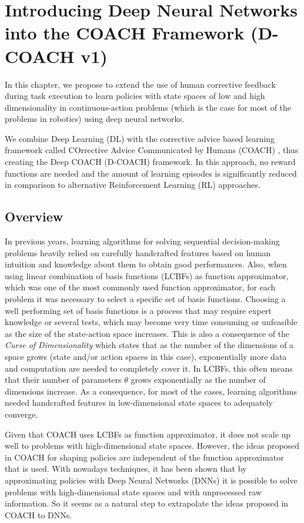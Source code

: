 \chapter{Introducing Deep Neural Networks into the COACH Framework (D-COACH v1)}
In this chapter, we propose to extend the use of human corrective feedback during task execution to learn policies with state spaces of low and high dimensionality in $\text{continuous-action}$ problems (which is the case for most of the problems in robotics) using deep neural networks.

 We combine Deep Learning (DL) with the corrective advice based learning framework called COrrective Advice Communicated by Humans (COACH) \cite{Celemin2018AnInteractive}, thus creating the Deep COACH (D-COACH) framework. In this approach, no reward functions are needed and the amount of learning episodes is significantly reduced in comparison to alternative Reinforcement Learning (RL) approaches.

\section{Overview}
In previous years, learning algorithms for solving sequential decision-making problems heavily relied on carefully handcrafted features based on human intuition and knowledge about them to obtain good performances. Also, when using linear combination of basis functions (LCBFs) as function approximator, which was one of the most commonly used function approximator, for each problem it was necessary to select a specific set of basis functions. Choosing a well performing set of basis functions is a process that may require expert knowledge or several tests, which may become very time consuming or unfeasible as the size of the $\text{state-action}$ space increases. This is also a consequence of the \emph{Curse of Dimensionality} \cite{Bellman1957} which states that as the number of the dimensions of a space grows (state and/or action spaces in this case), exponentially more data and computation are needed to completely cover it. In LCBFs, this often means that their number of parameters $\theta$ grows exponentially as the number of dimensions increase. As a consequence, for most of the cases, learning algorithms needed handcrafted features in low-dimensional state spaces to adequately converge.

Given that COACH uses LCBFs as function approximator, it does not scale up well to problems with high-dimensional state spaces. However, the ideas proposed in COACH for shaping policies are independent of the function approximator that is used. With nowadays techniques, it has been shown that by approximating policies with Deep Neural Networks (DNNs) it is possible to solve problems with high-dimensional state spaces and with unprocessed raw information. So it seems as a natural step to extrapolate the ideas proposed in COACH to DNNs. 

